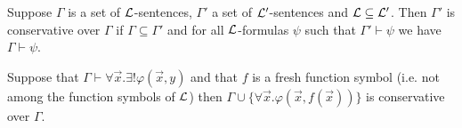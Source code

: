 \begin{boxdef}
\begin{defi}
    Suppose $\Gamma$ is a set of $\mathcal{L}$-sentences, $\Gamma'$ a set of $\mathcal{L}'$-sentences and $\mathcal{L} \subseteq \mathcal{L}'$.
    Then \alert{$\Gamma'$ is conservative over $\Gamma$} if $\Gamma \subseteq \Gamma'$ and for all $\mathcal{L}$-formulas $\psi$ such that $\Gamma' \vdash \psi$ we have $\Gamma \vdash \psi$. 
\end{defi}
\end{boxdef}

\begin{boxthm}
    Suppose that $\Gamma \vdash \forall \vec{x}. \exists! \varphi(\vec{x}, y)$ and that $f$ is a fresh function symbol (i.e. not among the function symbols of $\mathcal{L}$) then $\Gamma \cup \{\forall \vec{x}. \varphi(\vec{x}, f(\vec{x}))\}$ is conservative over $\Gamma$.
\end{boxthm}

